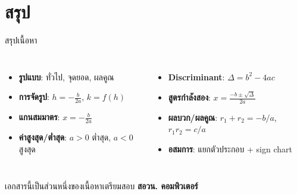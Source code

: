 \documentclass[11pt, aspectratio=169]{beamer}
\begin{document}
\section{สรุป}

\begin{frame}{สรุปเนื้อหา}
  \begin{explanation}[สิ่งที่ได้เรียนรู้]
    \begin{columns}[T]
        \begin{itemize}
          \item \textbf{รูปแบบ}: ทั่วไป, จุดยอด, ผลคูณ
          \item \textbf{การจัดรูป}: $h = -\frac{b}{2a}$, $k = f(h)$
          \item \textbf{แกนสมมาตร}: $x = -\frac{b}{2a}$
          \item \textbf{ค่าสูงสุด/ตํ่าสุด}: $a>0$ ตํ่าสุด, $a<0$ สูงสุด
        \end{itemize}
        \begin{itemize}
          \item \textbf{Discriminant}: $\Delta = b^2-4ac$
          \item \textbf{สูตรกำลังสอง}: $x = \frac{-b \pm \sqrt{\Delta}}{2a}$
          \item \textbf{ผลบวก/ผลคูณ}: $r_1+r_2 = -b/a$, $r_1r_2 = c/a$
          \item \textbf{อสมการ}: แยกตัวประกอบ + sign chart
        \end{itemize}
    \end{columns}
  \end{explanation}
  \begin{center}
    \large เอกสารนี้เป็นส่วนหนึ่งของเนื้อหาเตรียมสอบ \textbf{สอวน. คอมพิวเตอร์}
  \end{center}
\end{frame}
\end{document}
